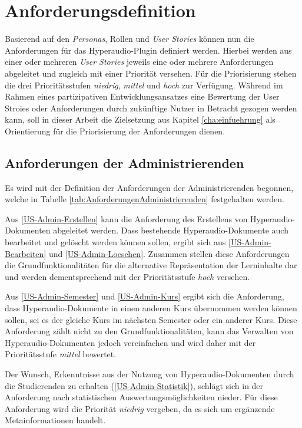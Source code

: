 \section{Anforderungsdefinition}
\label{sec:anforderungsdefinition}
Basierend auf den \textit{Personas}, Rollen und \textit{User Stories} können nun die Anforderungen für das Hyperaudio-Plugin definiert werden. Hierbei werden aus einer oder mehreren \textit{User Stories} jeweils eine oder mehrere Anforderungen abgeleitet und zugleich mit einer Priorität versehen. Für die Priorisierung stehen die drei Prioritätsstufen \textit{niedrig}, \textit{mittel} und \textit{hoch} zur Verfügung. Während im Rahmen eines partizipativen Entwicklungsansatzes eine Bewertung der User Stroies oder Anforderungen durch zukünftige Nutzer in Betracht gezogen werden kann, soll in dieser Arbeit die Zielsetzung aus Kapitel \ref{cha:einfuehrung} als Orientierung für die Priorisierung der Anforderungen dienen.

\subsection{Anforderungen der Administrierenden}
\label{sub:AnforderungenDerAdministrierenden}
Es wird mit der Definition der Anforderungen der Administrierenden begonnen, welche in Tabelle \ref{tab:AnforderungenAdministrierenden} festgehalten werden. 

Aus \ref{US-Admin-Erstellen} kann die Anforderung des Erstellens von Hyperaudio-Dokumenten abgeleitet werden. Dass bestehende Hyperaudio-Dokumente auch bearbeitet und gelöscht werden können sollen, ergibt sich aus \ref{US-Admin-Bearbeiten} und \ref{US-Admin-Loeschen}. Zusammen stellen diese Anforderungen die Grundfunktionalitäten für die alternative Repräsentation der Lerninhalte dar und werden dementsprechend mit der Prioritätsstufe \textit{hoch} versehen.

Aus \ref{US-Admin-Semester} und \ref{US-Admin-Kurs} ergibt sich die Anforderung, dass Hyperaudio-Dokumente in einen anderen Kurs übernommen werden können sollen, sei es der gleiche Kurs im nächsten Semester oder ein anderer Kurs. Diese Anforderung zählt nicht zu den Grundfunktionalitäten, kann das Verwalten von Hyperaudio-Dokumenten jedoch vereinfachen und wird daher mit der Prioritätsstufe \textit{mittel} bewertet.

Der Wunsch, Erkenntnisse aus der Nutzung von Hyperaudio-Dokumenten durch die Studierenden zu erhalten (\ref{US-Admin-Statistik}), schlägt sich in der Anforderung nach statistischen Auswertungsmöglichkeiten nieder. Für diese Anforderung wird die Priorität \textit{niedrig} vergeben, da es sich um ergänzende Metainformationen handelt.


